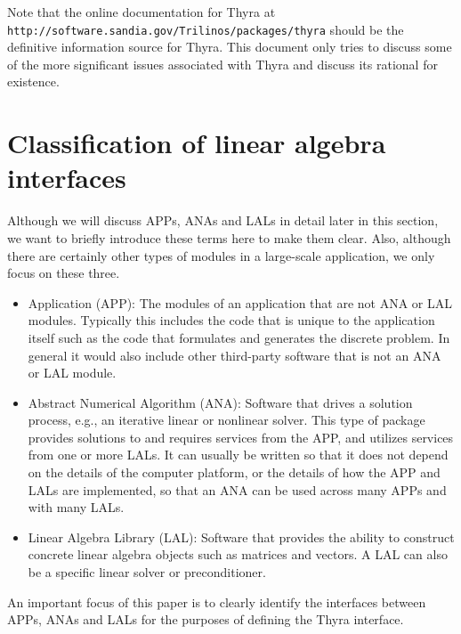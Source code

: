 \documentclass[pdf,ps2pdf,11pt]{SANDreport}
\begin{document}
Note that the online documentation for Thyra at
{}\texttt{http://software.sandia.gov/Trilinos/packages/thyra} should be the
definitive information source for Thyra.  This document only tries to discuss
some of the more significant issues associated with Thyra and discuss its
rational for existence.

%
\section{Classification of linear algebra interfaces}
\label{tsfcore:sec:classification_of_lin_alg_itfc}
%

Although we will discuss APPs, ANAs and LALs in detail later in this
section, we want to briefly introduce these terms here to make them
clear.  Also, although there are certainly other types of modules in a
large-scale application, we only focus on these three.
\begin{itemize}
\item Application (APP):  The modules of an application that are not
ANA or LAL modules.  Typically this includes the code that is unique
to the application itself such as the code that formulates and
generates the discrete problem.  In general it would also include
other third-party software that is not an ANA or LAL module.
\item Abstract Numerical Algorithm (ANA):  Software that drives a 
solution process, e.g., an iterative linear or nonlinear solver.  This
type of package provides solutions to and requires services from the
APP, and utilizes services from one or more LALs.  It can usually be
written so that it does not depend on the details of the computer
platform, or the details of how the APP and LALs are implemented, so
that an ANA can be used across many APPs and with many LALs.
\item Linear Algebra Library (LAL): Software that provides the 
ability to construct
concrete linear algebra objects such as matrices and vectors.  
A LAL can also be a specific linear solver or preconditioner.
\end{itemize}

An important focus of this paper is to clearly identify the interfaces
between APPs, ANAs and LALs for the purposes of defining the Thyra
interface.
\end{document}
